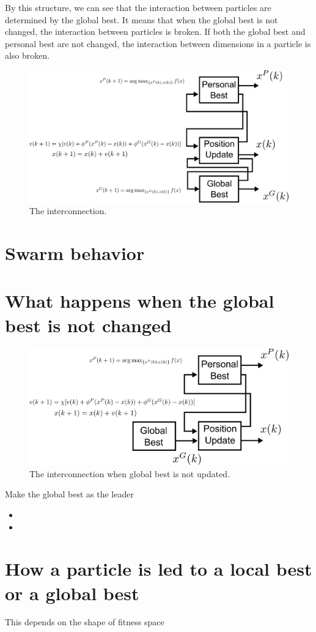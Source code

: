 \documentclass[10pt,a4paper]{article}
\begin{document}
By this structure, we can see that the interaction between particles are determined by the global best.
It means that when the global best is not changed, the interaction between particles is broken.
If both the global best and personal best are not changed, the interaction between dimensions in a particle is also broken.

\begin{figure}
\centering
\includegraphics[width=0.9\linewidth]{./structure}
\caption{The interconnection.}
\label{fig:structure}
\end{figure}



\section{Swarm behavior}


\section{What happens when the global best is not changed}

\begin{figure}
\centering
\includegraphics[width=0.8\linewidth]{./structure_constant_gb}
\caption{The interconnection when global best is not updated.}
\label{fig:structure_constant_gb}
\end{figure}


Make the global best as the leader

\begin{itemize}
\item 
\item 
\end{itemize}

\section{How a particle is led to a local best or a global best}

This depends on the shape of fitness space
\end{document}
